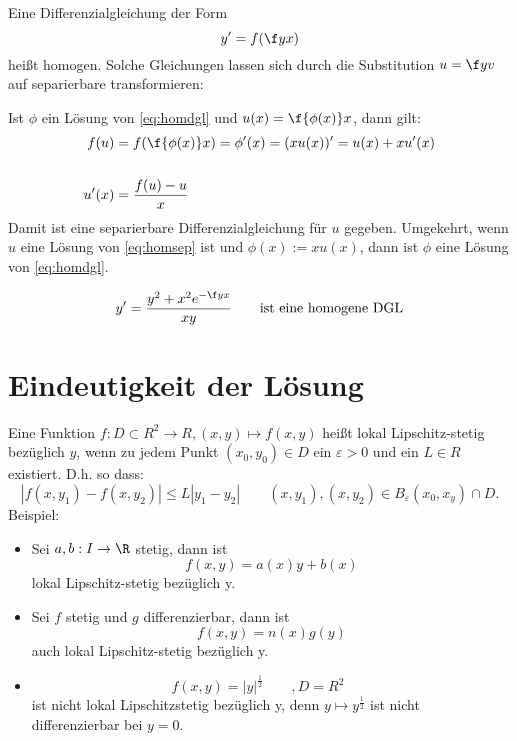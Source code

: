 \documentclass{mycourse}
\begin{document}
Eine Differenzialgleichung der Form
\begin{equation}
\label{eq:homdgl}
y'=f(\f yx)
\end{equation}
heißt homogen. Solche Gleichungen lassen sich durch die Substitution
$u=\f yv$ auf separierbare transformieren:

Ist $\phi$ ein Lösung von \eqref{eq:homdgl} und $u(x) = \f{\phi (x)}x$, dann gilt:
\begin{align}
	f(u) &= f(\f{\phi(x)}x) = \phi'(x) = (xu(x))'=u(x) + xu'(x)\\
\label{eq:homsep}\\
u'(x) &= \frac{f(u)-u}{x}
\end{align}
Damit ist eine separierbare Differenzialgleichung für $u$ gegeben.
Umgekehrt, wenn $u$ eine Lösung von \eqref{eq:homsep} ist und $\phi(x):=xu(x)$, dann
ist $\phi$ eine Lösung von \eqref{eq:homdgl}.

\begin{ex*}
\[
y'=\frac{y^2+x^2e^{-\f yx}}{xy} \qquad \text{ist eine homogene DGL}
\]
\end{ex*}

\section{Eindeutigkeit der Lösung}

Eine Funktion $f:D\subset R^2\to R, (x,y)\mapsto f(x,y)$ heißt lokal Lipschitz-stetig
bezüglich $y$, wenn zu jedem Punkt $(x_0,y_0)\in D$ ein $\varepsilon > 0$ und ein $L\in R$ existiert.
D.h. so dass:
\[
|f(x,y_1)-f(x,y_2)| \le L|y_1-y_2| \qquad 
(x,y_1),(x,y_2) \in B_\varepsilon (x_0,x_y) \cap D.
\]
Beispiel:
\begin{itemize}
\item
Sei $a,b:I\to\R$ stetig, dann ist
\[
f(x,y)=a(x)y + b(x)
\]
lokal Lipschitz-stetig bezüglich y.
\item
Sei $f$ stetig und $g$ differenzierbar, dann ist
\[
f(x,y) = n(x)g(y)
\]
auch lokal Lipschitz-stetig bezüglich y.
\item
\[
f(x,y)={|y|}^{\frac 12} \qquad, D=R^2 \qquad
\]
ist nicht lokal Lipschitzstetig bezüglich y, denn $y\mapsto y^{\frac 12}$ ist nicht differenzierbar bei $y=0$.
\end{itemize}
\end{document}
